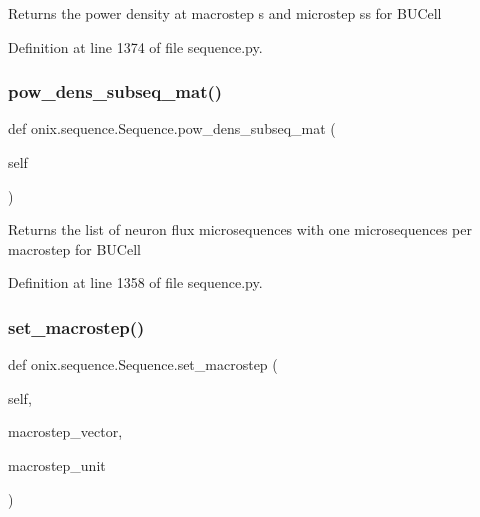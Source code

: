 \begin{DoxyVerb}Returns the power density at macrostep s and microstep ss for BUCell\end{DoxyVerb}
 

Definition at line 1374 of file sequence.\+py.

\mbox{\label{classonix_1_1sequence_1_1Sequence_a85a5edc9d1b97fcc1c4b8c20aa0069b0}} 
\subsubsection{\texorpdfstring{pow\+\_\+dens\+\_\+subseq\+\_\+mat()}{pow\_dens\_subseq\_mat()}}
{\footnotesize\ttfamily def onix.\+sequence.\+Sequence.\+pow\+\_\+dens\+\_\+subseq\+\_\+mat (\begin{DoxyParamCaption}\item[{}]{self }\end{DoxyParamCaption})}

\begin{DoxyVerb}Returns the list of neuron flux microsequences with one microsequences per macrostep
for BUCell\end{DoxyVerb}
 

Definition at line 1358 of file sequence.\+py.

\mbox{\label{classonix_1_1sequence_1_1Sequence_ac5a703466edd1b937689ed12ac3c624d}} 
\subsubsection{\texorpdfstring{set\+\_\+macrostep()}{set\_macrostep()}}
{\footnotesize\ttfamily def onix.\+sequence.\+Sequence.\+set\+\_\+macrostep (\begin{DoxyParamCaption}\item[{}]{self,  }\item[{}]{macrostep\+\_\+vector,  }\item[{}]{macrostep\+\_\+unit }\end{DoxyParamCaption})}


